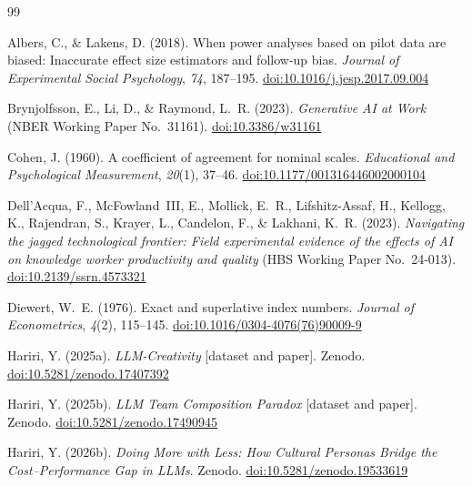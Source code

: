 \documentclass[12pt,a4paper]{article}
\begin{document}
\begin{thebibliography}{99}

Albers, C., \& Lakens, D. (2018).
When power analyses based on pilot data are biased: Inaccurate effect size
  estimators and follow-up bias.
\textit{Journal of Experimental Social Psychology}, \textit{74}, 187--195.
\href{https://doi.org/10.1016/j.jesp.2017.09.004}{doi:10.1016/j.jesp.2017.09.004}

Brynjolfsson, E., Li, D., \& Raymond, L.~R. (2023).
\textit{Generative AI at Work} (NBER Working Paper No.~31161).
\href{https://doi.org/10.3386/w31161}{doi:10.3386/w31161}

Cohen, J. (1960).
A coefficient of agreement for nominal scales.
\textit{Educational and Psychological Measurement}, \textit{20}(1), 37--46.
\href{https://doi.org/10.1177/001316446002000104}{doi:10.1177/001316446002000104}

Dell'Acqua, F., McFowland~III, E., Mollick, E.~R., Lifshitz-Assaf, H.,
  Kellogg, K., Rajendran, S., Krayer, L., Candelon, F., \& Lakhani, K.~R.
  (2023).
\textit{Navigating the jagged technological frontier: Field experimental
  evidence of the effects of AI on knowledge worker productivity and quality}
  (HBS Working Paper No.~24-013).
\href{https://doi.org/10.2139/ssrn.4573321}{doi:10.2139/ssrn.4573321}

Diewert, W.~E. (1976).
Exact and superlative index numbers.
\textit{Journal of Econometrics}, \textit{4}(2), 115--145.
\href{https://doi.org/10.1016/0304-4076(76)90009-9}{doi:10.1016/0304-4076(76)90009-9}

Hariri, Y. (2025a).
\textit{LLM-Creativity} [dataset and paper]. Zenodo.
\href{https://doi.org/10.5281/zenodo.17407392}{doi:10.5281/zenodo.17407392}

Hariri, Y. (2025b).
\textit{LLM Team Composition Paradox} [dataset and paper]. Zenodo.
\href{https://doi.org/10.5281/zenodo.17490945}{doi:10.5281/zenodo.17490945}

Hariri, Y. (2026b).
\textit{Doing More with Less: How Cultural Personas Bridge the Cost--Performance
  Gap in LLMs}. Zenodo.
\href{https://doi.org/10.5281/zenodo.19533619}{doi:10.5281/zenodo.19533619}


\end{thebibliography}
\end{document}
